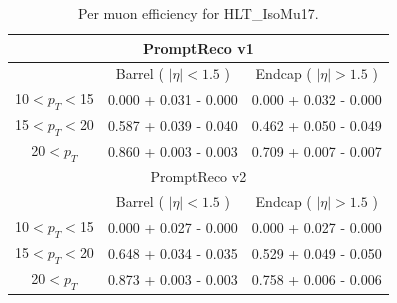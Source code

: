 \begin{table}[!ht]
\begin{center}
\begin{tabular}{c|c|c} 
\hline
\multicolumn{3}{c}{PromptReco v1}                                \\
\hline
              & Barrel ( $|\eta|<1.5$ )  & Endcap ( $|\eta|>1.5$ ) \\ 
\hline
\hline
10$<p_{T}<$15 & 0.000 + 0.031 - 0.000  & 0.000 + 0.032 - 0.000     \\  \hline
15$<p_{T}<$20 & 0.587 + 0.039 - 0.040  & 0.462 + 0.050 - 0.049     \\  \hline
20$<p_{T}$   & 0.860 + 0.003 - 0.003  & 0.709 + 0.007 - 0.007      \\
\hline
\hline
\multicolumn{3}{c}{PromptReco v2}                                \\
\hline
              & Barrel ( $|\eta|<1.5$ )  & Endcap ( $|\eta|>1.5$ ) \\ 
\hline
\hline
10$<p_{T}<$15 & 0.000 + 0.027 - 0.000  & 0.000 + 0.027 - 0.000     \\  \hline
15$<p_{T}<$20 & 0.648 + 0.034 - 0.035  & 0.529 + 0.049 - 0.050     \\  \hline
20$<p_{T}$   & 0.873 + 0.003 - 0.003  & 0.758 + 0.006 - 0.006      \\
\hline
\end{tabular}
\caption{Per muon efficiency for HLT\_IsoMu17.}
\label{tab:eff_single_isomu}
\end{center}
\end{table}

